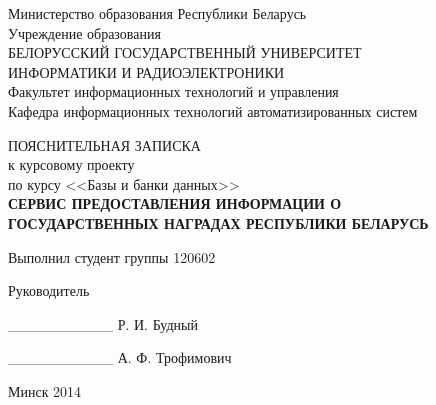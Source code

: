 \begin{titlepage}
\thispagestyle{empty}
\setlength{\parindent}{0ex} %

\begin{center}
  Министерство образования Республики Беларусь \\
  \smallskip
  Учреждение образования \\
  БЕЛОРУССКИЙ ГОСУДАРСТВЕННЫЙ УНИВЕРСИТЕТ \\
  ИНФОРМАТИКИ И РАДИОЭЛЕКТРОНИКИ \\
  \smallskip
  Факультет информационных технологий и управления \\
  \smallskip
  Кафедра информационных технологий автоматизированных систем
\end{center}

\vspace{50mm}

\begin{center}
  ПОЯСНИТЕЛЬНАЯ ЗАПИСКА \\
  к курсовому проекту \\
  по курсу <<Базы и банки данных>>\\
  \textbf{СЕРВИС ПРЕДОСТАВЛЕНИЯ ИНФОРМАЦИИ О \\
    ГОСУДАРСТВЕННЫХ НАГРАДАХ РЕСПУБЛИКИ БЕЛАРУСЬ} \\
\end{center}

\vspace{30mm}

\begin{minipage}{.45\linewidth}
    Выполнил студент группы 120602 

    \smallskip

    Руководитель 
\end{minipage}
\hfill
\begin{minipage}{.45\linewidth}
    \_\_\_\_\_\_\_\_\_\_ Р. И. Будный

    \smallskip

    \_\_\_\_\_\_\_\_\_\_ А. Ф. Трофимович 
\end{minipage}

\vspace{60mm}
\begin{center}
  Минск 2014
\end{center}

\setlength{\parindent}{5ex} %
\end{titlepage}